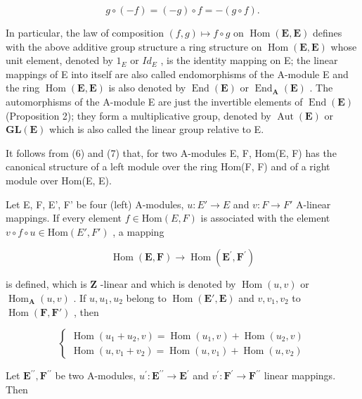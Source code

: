 \[
g \circ (- f) = (- g) \circ f = - (g \circ f).
\]

In particular, the law of composition \((f,g)\mapsto f\circ g\) on \(\operatorname{Hom}(\mathbf{E},\mathbf{E})\) defines with the above additive group structure a ring structure on \(\operatorname{Hom}(\mathbf{E},\mathbf{E})\) whose unit element, denoted by \(1_{E}\) or \(Id_{E}\) , is the identity mapping on E; the linear mappings of E into itself are also called endomorphisms of the A-module E and the ring \(\operatorname{Hom}(\mathbf{E},\mathbf{E})\) is also denoted by \(\operatorname{End}(\mathbf{E})\) or \(\operatorname{End}_{\mathbf{A}}(\mathbf{E})\) . The automorphisms of the A-module E are just the invertible elements of \(\operatorname{End}(\mathbf{E})\) (Proposition 2); they form a multiplicative group, denoted by \(\operatorname{Aut}(\mathbf{E})\) or \(\mathbf{GL}(\mathbf{E})\) which is also called the linear group relative to E.

It follows from (6) and (7) that, for two A-modules E, F, Hom(E, F) has the canonical structure of a left module over the ring Hom(F, F) and of a right module over Hom(E, E).

Let E, F, E', F' be four (left) A-modules, \(u: E' \to E\) and \(v: F \to F'\) A-linear mappings. If every element \(f \in \text{Hom}(E, F)\) is associated with the element \(v \circ f \circ u \in \text{Hom}(E', F')\) , a mapping

\[
\operatorname{Hom} (\mathbf {E}, \mathbf {F}) \rightarrow \operatorname{Hom} (\mathbf {E} ^ {\prime}, \mathbf {F} ^ {\prime})
\]

is defined, which is \(\mathbf{Z}\) -linear and which is denoted by \(\operatorname{Hom}(u,v)\) or \(\operatorname{Hom}_{\mathbf{A}}(u,v)\) . If \(u, u_1, u_2\) belong to \(\operatorname{Hom}(\mathbf{E}', \mathbf{E})\) and \(v, v_1, v_2\) to \(\operatorname{Hom}(\mathbf{F}, \mathbf{F}')\) , then

\[
\left\{ \begin{array}{l} \operatorname{Hom} (u _ {1} + u _ {2}, v) = \operatorname{Hom} (u _ {1}, v) + \operatorname{Hom} (u _ {2}, v) \\ \operatorname{Hom} (u, v _ {1} + v _ {2}) = \operatorname{Hom} (u, v _ {1}) + \operatorname{Hom} (u, v _ {2}) \end{array} \right.\tag{9}
\]

Let \(\mathbf{E}^{\prime \prime},\mathbf{F}^{\prime \prime}\) be two A-modules, \(u^{\prime}:\mathbf{E}^{\prime \prime}\to \mathbf{E}^{\prime}\) and \(v^{\prime}:\mathbf{F}^{\prime}\rightarrow \mathbf{F}^{\prime \prime}\) linear mappings. Then

